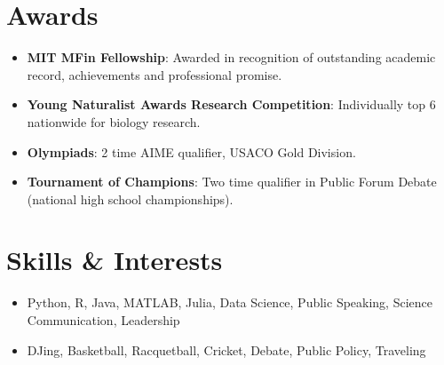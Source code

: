\documentclass[letterpaper,10pt]{article}
\newcommand{\resumeItem}[2]{
  \item\small{
    \textbf{#1}{: #2 \vspace{-2pt}}
  }
}
\newcommand{\resumeSubItem}[2]{\resumeItem{#1}{#2}\vspace{-4pt}}
\newcommand{\resumeSubHeadingListStart}{\begin{itemize}[leftmargin=*]}
\newcommand{\resumeSubHeadingListEnd}{\end{itemize}}
\begin{document}
\section{Awards}
  \resumeSubHeadingListStart
    \resumeSubItem{MIT MFin Fellowship}
        {Awarded in recognition of outstanding academic record, achievements and professional promise.}
    \resumeSubItem{Young Naturalist Awards Research Competition}
      {Individually top 6 nationwide for biology research.}
    \resumeSubItem{Olympiads}
      {2 time AIME qualifier, USACO Gold Division.}
     \resumeSubItem{Tournament of Champions}
      {Two time qualifier in Public Forum Debate (national high school championships).}


  \resumeSubHeadingListEnd

%
\section{Skills \& Interests}
 \resumeSubHeadingListStart
   \item{
   	Python, R, Java, MATLAB, Julia, Data Science, Public Speaking, Science Communication, Leadership
   }
  \item{
    DJing, Basketball, Racquetball, Cricket, Debate, Public Policy, Traveling
  }
 \resumeSubHeadingListEnd


\end{document}
